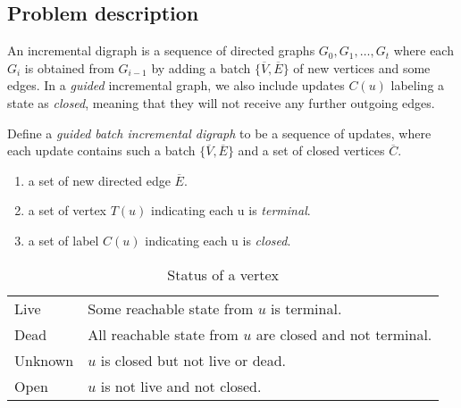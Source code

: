 \subsection{Problem description}
An incremental digraph is a sequence of directed graphs $G_0, G_1, \ldots, G_t$ where each $G_i$ is obtained from $G_{i-1}$ by adding a batch $\{\overline V, \overline E\}$ of new vertices and some edges. In a \textsl{guided} incremental graph, we also include updates $C(u)$ labeling a state as \textsl{closed}, meaning that they will not receive any further outgoing edges.

\begin{definition}
    Define a \textsl{guided batch incremental digraph} to be a sequence of updates, where each update contains such a batch $\{\overline V, \overline E\}$ and a set of closed vertices $\overline C$.

    \begin{enumerate}
        \item a set of new directed edge $\overline E$.
        \item a set of vertex $T(u)$ indicating each u is \textsl{terminal}.
        \item a set of label $C(u)$ indicating each u is \textsl{closed}.
    \end{enumerate}
\end{definition}

\begin{table}
    \begin{tabular}{l|l}
        \hline
        Live & Some reachable state from $u$ is terminal. \\
        Dead & All reachable state from $u$ are closed and not terminal. \\
        Unknown & $u$ is closed but not live or dead. \\
        Open & $u$ is not live and not closed. \\
        \hline
    \end{tabular}
    \caption{Status of a vertex}
    \label{tab:status}
\end{table}